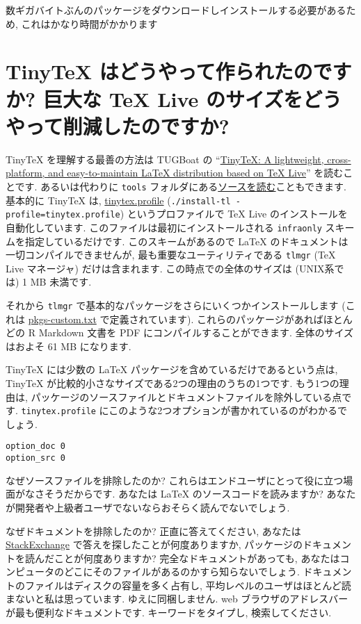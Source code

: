 \documentclass[
  xelatex,ja=standard,jafont=noto]{bxjsreport}
\begin{document}
数ギガバイトぶんのパッケージをダウンロードしインストールする必要があるため,
これはかなり時間がかかります

\hypertarget{faq-size}{%
\section{TinyTeX はどうやって作られたのですか? 巨大な TeX Live
のサイズをどうやって削減したのですか?}\label{faq-size}}

TinyTeX を理解する最善の方法は TUGBoat の
``\href{https://tug.org/TUGboat/Contents/contents40-1.html}{TinyTeX: A
lightweight, cross-platform, and easy-to-maintain LaTeX distribution
based on TeX Live}'' を読むことです. あるいは代わりに \texttt{tools}
フォルダにある\href{https://github.com/yihui/tinytex/}{ソースを読む}こともできます.
基本的に TinyTeX は,
\href{https://github.com/yihui/tinytex/blob/master/tools/tinytex.profile}{tinytex.profile}
(\texttt{./install-tl\ -profile=tinytex.profile}) というプロファイルで
TeX Live のインストールを自動化しています.
このファイルは最初にインストールされる \texttt{infraonly}
スキームを指定しているだけです. このスキームがあるので LaTeX
のドキュメントは一切コンパイルできませんが,
最も重要なユーティリティである \texttt{tlmgr} (TeX Live マネージャ)
だけは含まれます. この時点での全体のサイズは (UNIX系では) 1 MB 未満です.

それから \texttt{tlmgr}
で基本的なパッケージをさらにいくつかインストールします (これは
\href{https://github.com/yihui/tinytex/blob/master/tools/pkgs-custom.txt}{pkgs-custom.txt}
で定義されています). これらのパッケージがあればほとんどの R Markdown
文書を PDF にコンパイルすることができます. 全体のサイズはおよそ 61 MB
になります.

TinyTeX には少数の LaTeX パッケージを含めているだけであるという点は,
TinyTeX が比較的小さなサイズである2つの理由のうちの1つです.
もう1つの理由は,
パッケージのソースファイルとドキュメントファイルを除外している点です.
\texttt{tinytex.profile}
にこのような2つオプションが書かれているのがわかるでしょう.

\begin{verbatim}
option_doc 0
option_src 0
\end{verbatim}

なぜソースファイルを排除したのか?
これらはエンドユーザにとって役に立つ場面がなさそうだからです. あなたは
LaTeX のソースコードを読みますか?
あなたが開発者や上級者ユーザでないならおそらく読んでないでしょう.

なぜドキュメントを排除したのか? 正直に答えてください, あなたは
\href{https://tex.stackexchange.com}{StackExchange}
で答えを探したことが何度ありますか,
パッケージのドキュメントを読んだことが何度ありますか?
完全なドキュメントがあっても,
あなたはコンピュータのどこにそのファイルがあるのかすら知らないでしょう.
ドキュメントのファイルはディスクの容量を多く占有し,
平均レベルのユーザはほとんど読まないと私は思っています.
ゆえに同梱しません. web
ブラウザのアドレスバーが最も便利なドキュメントです.
キーワードをタイプし, 検索してください.
\end{document}
